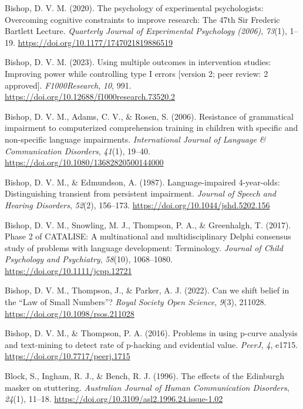 \documentclass{krantz}
\newlength{\cslhangindent}
\newlength{\cslentryspacingunit} %
\newenvironment{CSLReferences}[2] %
{%
\setlength{\parindent}{0pt}
\ifodd #1
\let\oldpar\par
\def\par{\hangindent=\cslhangindent\oldpar}
\fi
\setlength{\parskip}{#2\cslentryspacingunit}
}%
{}
\begin{document}
\begin{CSLReferences}{1}{0}
\leavevmode{}%
Bishop, D. V. M. (2020). The psychology of experimental psychologists: {Overcoming} cognitive constraints to improve research: {The} 47th {Sir Frederic Bartlett Lecture}. \emph{Quarterly Journal of Experimental Psychology (2006)}, \emph{73}(1), 1--19. \url{https://doi.org/10.1177/1747021819886519}

\leavevmode{}%
Bishop, D. V. M. (2023). Using multiple outcomes in intervention studies: Improving power while controlling type {I} errors {[}version 2; peer review: 2 approved{]}. \emph{F1000Research}, \emph{10}, 991. \url{https://doi.org/10.12688/f1000research.73520.2}

\leavevmode{}%
Bishop, D. V. M., Adams, C. V., \& Rosen, S. (2006). Resistance of grammatical impairment to computerized comprehension training in children with specific and non-specific language impairments. \emph{International Journal of Language \& Communication Disorders}, \emph{41}(1), 19--40. \url{https://doi.org/10.1080/13682820500144000}

\leavevmode{}%
Bishop, D. V. M., \& Edmundson, A. (1987). Language-impaired 4-year-olds: {Distinguishing} transient from persistent impairment. \emph{Journal of Speech and Hearing Disorders}, \emph{52}(2), 156--173. \url{https://doi.org/10.1044/jshd.5202.156}

\leavevmode{}%
Bishop, D. V. M., Snowling, M. J., Thompson, P. A., \& Greenhalgh, T. (2017). Phase 2 of {CATALISE}: A multinational and multidisciplinary {Delphi} consensus study of problems with language development: {Terminology}. \emph{Journal of Child Psychology and Psychiatry}, \emph{58}(10), 1068--1080. \url{https://doi.org/10.1111/jcpp.12721}

\leavevmode{}%
Bishop, D. V. M., Thompson, J., \& Parker, A. J. (2022). Can we shift belief in the {``{Law} of {Small Numbers}''}? \emph{Royal Society Open Science}, \emph{9}(3), 211028. \url{https://doi.org/10.1098/rsos.211028}

\leavevmode{}%
Bishop, D. V. M., \& Thompson, P. A. (2016). Problems in using p-curve analysis and text-mining to detect rate of p-hacking and evidential value. \emph{PeerJ}, \emph{4}, e1715. \url{https://doi.org/10.7717/peerj.1715}

\leavevmode{}%
Block, S., Ingham, R. J., \& Bench, R. J. (1996). The effects of the {Edinburgh} masker on stuttering. \emph{Australian Journal of Human Communication Disorders}, \emph{24}(1), 11--18. \url{https://doi.org/10.3109/asl2.1996.24.issue-1.02}


\end{CSLReferences}
\end{document}
